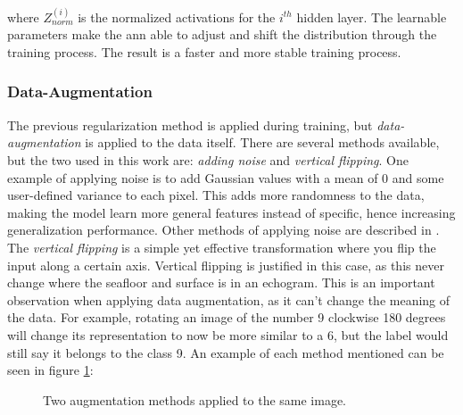     where $Z^{(i)}_{norm}$ is the normalized activations for the $i^{th}$ hidden layer. The learnable parameters make the \gls{ann} able to adjust and shift the distribution through the training process. The result is a faster and more stable training process. 

\subsubsection{Data-Augmentation}
    The previous regularization method is applied during training, but \textit{data-augmentation} is applied to the data itself\cite{kukavcka2017_regularization}. There are several methods available, but the two used in this work are: \textit{adding noise} and \textit{vertical flipping}. One example of applying noise is to add Gaussian values with a mean of 0 and some user-defined variance to each pixel. This adds more randomness to the data, making the model learn more general features instead of specific, hence increasing generalization performance. Other methods of applying noise are described in \citeauthor{kukavcka2017_regularization}\cite{kukavcka2017_regularization}.  The \textit{vertical flipping} is a simple yet effective transformation where you flip the input along a certain axis. Vertical flipping is justified in this case, as this never change where the seafloor and surface is in an echogram. This is an important observation when applying data augmentation, as it can't change the meaning of the data. For example, rotating an image of the number 9 clockwise 180 degrees will change its representation to now be more similar to a 6, but the label would still say it belongs to the class 9.    An example of each method mentioned can be seen in figure \ref{data augmentation fig}:
    
    \begin{figure}[H]
        \centering
        
        
        
        
        \caption[Two data augmentation examples]{Two augmentation methods applied to the same image.}
        \label{data augmentation fig}
        
        \end{figure}
    
